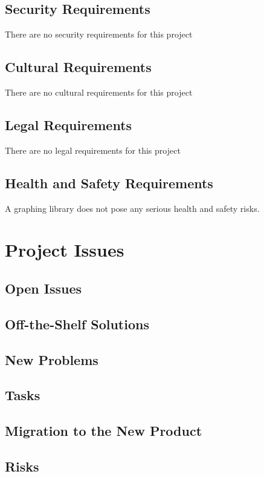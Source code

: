 \documentclass[12pt, titlepage]{article}
\begin{document}
\subsection{Security Requirements}
There are no security requirements for this project
\subsection{Cultural Requirements}
There are no cultural requirements for this project
\subsection{Legal Requirements}
There are no legal requirements for this project
\subsection{Health and Safety Requirements} %

A graphing library does not pose any serious health and safety risks.

\clearpage
\section{Project Issues}

\subsection{Open Issues}

\subsection{Off-the-Shelf Solutions}

\subsection{New Problems}

\subsection{Tasks} 

\subsection{Migration to the New Product}

\subsection{Risks}
\end{document}
